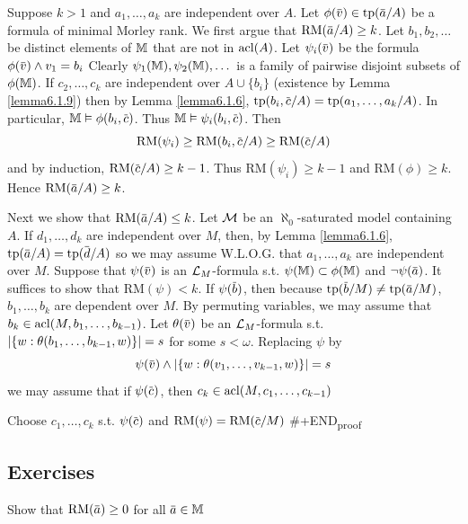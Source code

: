 \documentclass[11pt]{article}
\def \RM {\text{RM}}
\begin{document}
Suppose \(k>1\) and \(a_1,\dots,a_k\) are independent over \(A\). Let \(\phi(\barv)\in\tp(\bara/A)\) be a
formula of minimal Morley rank. We first argue that \(\RM(\bara/A)\ge k\). Let \(b_1,b_2,\dots\) be
distinct elements of \(\mathbb{M}\) that are not in \(\operatorname{acl}(A)\).
Let \(\psi_i(\barv)\) be the formula \(\phi(\barv)\wedge v_1=b_i\)
Clearly \(\psi_1(\mathbb{M}),\psi_2(\mathbb{M}),\dots\) is a family of pairwise disjoint subsets of \(\phi(\mathbb{M})\). If \(c_2,\dots,c_k\)
are independent over \(A\cup\{b_i\}\) (existence by Lemma \ref{lemma6.1.9}) then by Lemma
\ref{lemma6.1.6}, \(\tp(b_i,\barc/A)=\tp(a_1,\dots,a_k/A)\). In particular, \(\M\vDash\phi(b_i,\barc)\).
Thus \(\M\vDash\psi_i(b_i,\barc)\). Then
\begin{equation*}
\RM(\psi_i)\ge\RM(b_i,\barc/A)\ge\RM(\barc/A)
\end{equation*}
and by induction, \(\RM(\barc/A)\ge k-1\). Thus \(\RM(\psi_i)\ge k-1\) and \(\RM(\phi)\ge k\).
Hence \(\RM(\bara/A)\ge k\).

Next we show that \(\RM(\bara/A)\le k\). Let \(\mathcal{M}\) be an \(\aleph_0\)-saturated model containing \(A\).
If \(d_1,\dots,d_k\) are independent over \(M\), then, by Lemma
\ref{lemma6.1.6}, \(\tp(\bara/A)=\tp(\bard/A)\) so we may assume W.L.O.G. that \(a_1,\dots,a_k\) are
independent over \(M\). Suppose that \(\psi(\barv)\) is an \(\mathcal{L}_M\)-formula s.t. \(\psi(\mathbb{M})\subset\phi(\mathbb{M})\)
and \(\neg\psi(\bara)\).
It suffices to show that \(\RM(\psi)<k\). If \(\psi(\barb)\), then
because \(\tp(\barb/M)\neq\tp(\bara/M)\), \(b_1,\dots,b_k\) are dependent over \(M\). By permuting
variables, we may assume that \(b_k\in\operatorname{acl}(M,b_1,\dots,b_{k-1})\). Let \(\theta(\barv)\) be
an \(\mathcal{L}_M\)-formula s.t. \(\abs{\{w:\theta(b_1,\dots,b_{k-1},w)\}}=s\) for some \(s<\omega\). Replacing \(\psi\) by
\begin{equation*}
\psi(\barv)\wedge\abs{\{w:\theta(v_1,\dots,v_{k-1},w)\}}=s
\end{equation*}
we may assume that if \(\psi(\barc)\), then \(c_k\in\operatorname{acl}(M,c_1,\dots,c_{k-1})\)

Choose \(c_1,\dots,c_k\) s.t. \(\psi(\barc)\) and \(\RM(\psi)=\RM(\barc/M)\)
\#+END\textsubscript{proof}


\subsection{Exercises}
\label{sec:org35d1987}
\begin{exercise}
\label{ex6.6.10}
Show that \(\RM(\bara)\ge 0\) for all \(\bara\in\M\)
\end{exercise}
\end{document}
